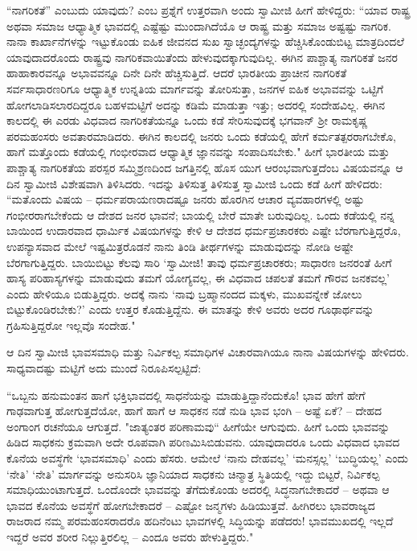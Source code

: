 “ನಾಗರಿಕತೆ” ಎಂಬುದು ಯಾವುದು? ಎಂಬ ಪ್ರಶ್ನೆಗೆ ಉತ್ತರವಾಗಿ ಅಂದು ಸ್ವಾಮೀಜಿ ಹೀಗೆ ಹೇಳಿದ್ದರು: “ಯಾವ ರಾಷ್ಟ್ರ ಅಥವಾ ಸಮಾಜ ಆಧ್ಯಾತ್ಮಿಕ ಭಾವದಲ್ಲಿ ಎಷ್ಟೆಷ್ಟು ಮುಂದಾಗಿದೆಯೊ ಆ ರಾಷ್ಟ್ರ ಮತ್ತು ಸಮಾಜ ಅಷ್ಟಷ್ಟು ನಾಗರಿಕ. ನಾನಾ ಕಾರ್ಖಾನೆಗಳನ್ನು ಇಟ್ಟುಕೊಂಡು ಐಹಿಕ ಜೀವನದ ಸುಖ ಸ್ವಾಚ್ಛಂದ್ಯಗಳನ್ನು ಹೆಚ್ಚಿಸಿಕೊಂಡುಬಿಟ್ಟ ಮಾತ್ರದಿಂದಲೆ ಯಾವುದಾದರೊಂದು ರಾಷ್ಟ್ರವು ನಾಗರಿಕವಾಯಿತೆಂದು ಹೇಳುವುದಕ್ಕಾಗುವುದಿಲ್ಲ. ಈಗಿನ ಪಾಶ್ಚಾತ್ಯ ನಾಗರಿಕತೆ ಜನರ ಹಾಹಾಕಾರವನ್ನೂ ಅಭಾವವನ್ನೂ ದಿನೇ ದಿನೇ ಹೆಚ್ಚಿಸುತ್ತಿದೆ. ಆದರೆ ಭಾರತೀಯ ಪ್ರಾಚೀನ ನಾಗರಿಕತೆ ಸರ್ವಸಾಧಾರಣರಿಗೂ ಆಧ್ಯಾತ್ಮಿಕ ಉನ್ನತಿಯ ಮಾರ್ಗವನ್ನು ತೋರಿಸುತ್ತಾ, ಜನಗಳ ಐಹಿಕ ಅಭಾವವನ್ನು ಒಟ್ಟಿಗೆ ಹೋಗಲಾಡಿಸಲಾರದಿದ್ದರೂ ಬಹಳಮಟ್ಟಿಗೆ ಅದನ್ನು ಕಡಿಮೆ ಮಾಡುತ್ತಾ ಇತ್ತು; ಅದರಲ್ಲಿ ಸಂದೇಹವಿಲ್ಲ. ಈಗಿನ ಕಾಲದಲ್ಲಿ ಈ ಎರಡು ವಿಧವಾದ ನಾಗರಿಕತೆಯನ್ನೂ ಒಂದು ಕಡೆ ಸೇರಿಸುವುದಕ್ಕೆ ಭಗವಾನ್ ಶ‍್ರೀ ರಾಮಕೃಷ್ಣ ಪರಮಹಂಸರು ಅವತಾರಮಾಡಿದರು. ಈಗಿನ ಕಾಲದಲ್ಲಿ ಜನರು ಒಂದು ಕಡೆಯಲ್ಲಿ ಹೇಗೆ ಕರ್ಮತತ್ಪರರಾಗಬೇಕೊ, ಹಾಗೆ ಮತ್ತೊಂದು ಕಡೆಯಲ್ಲಿ ಗಂಭೀರವಾದ ಆಧ್ಯಾತ್ಮಿಕ ಜ್ಞಾನವನ್ನು ಸಂಪಾದಿಸಬೇಕು." ಹೀಗೆ ಭಾರತೀಯ ಮತ್ತು ಪಾಶ್ಚಾತ್ಯ ನಾಗರಿಕತೆಯ ಪರಸ್ಪರ ಸಮ್ಮಿಶ್ರಣದಿಂದ ಜಗತ್ತಿನಲ್ಲಿ ಹೊಸ ಯುಗ ಆರಂಭವಾಗುತ್ತದೆಂಬ ವಿಷಯವನ್ನೂ ಆ ದಿನ ಸ್ವಾಮೀಜಿ ವಿಶೇಷವಾಗಿ ತಿಳಿಸಿದರು. ಇದನ್ನು ತಿಳಿಸುತ್ತ ತಿಳಿಸುತ್ತ ಸ್ವಾಮೀಜಿ ಒಂದು ಕಡೆ ಹೀಗೆ ಹೇಳಿದರು: “ಮತೊಂದು ವಿಷಯ – ಧರ್ಮಪರಾಯಣರಾದಷ್ಟೂ ಜನರು ಹೊರಗಿನ ಆಚಾರ ವ್ಯವಹಾರಗಳಲ್ಲಿ ಅಷ್ಟು ಗಂಭೀರರಾಗಬೇಕೆಂದು ಆ ದೇಶದ ಜನರ ಭಾವನೆ; ಬಾಯಲ್ಲಿ ಬೇರೆ ಮಾತೇ ಬರುವುದಿಲ್ಲ. ಒಂದು ಕಡೆಯಲ್ಲಿ ನನ್ನ ಬಾಯಿಂದ ಉದಾರವಾದ ಧಾರ್ಮಿಕ ವಿಷಯಗಳನ್ನು ಕೇಳಿ ಆ ದೇಶದ ಧರ್ಮಪ್ರಚಾರಕರು ಎಷ್ಟೇ ಬೆರಗಾಗುತ್ತಿದ್ದರೊ, ಉಪನ್ಯಾಸವಾದ ಮೇಲೆ ಇಷ್ಟಮಿತ್ರರೊಡನೆ ನಾನು ತಿಂಡಿ ತೀರ್ಥಗಳನ್ನು ಮಾಡುವುದನ್ನು ನೋಡಿ ಅಷ್ಟೇ ಬೆರಗಾಗುತ್ತಿದ್ದರು. ಬಾಯಿಬಿಟ್ಟು ಕೆಲವು ಸಾರಿ ‘ಸ್ವಾಮೀಜಿ! ತಾವು ಧರ್ಮಪ್ರಚಾರಕರು; ಸಾಧಾರಣ ಜನರಂತೆ ಹೀಗೆ ಹಾಸ್ಯ ಪರಿಹಾಸ್ಯಗಳನ್ನು ಮಾಡುವುದು ತಮಗೆ ಯೋಗ್ಯವಲ್ಲ, ಈ ವಿಧವಾದ ಚಪಲತೆ ತಮಗೆ ಗೌರವ ಜನಕವಲ್ಲ’ ಎಂದು ಹೇಳಿಯೂ ಬಿಡುತ್ತಿದ್ದರು. ಅದಕ್ಕೆ ನಾನು ‘ನಾವು ಬ್ರಹ್ಮಾನಂದದ ಮಕ್ಕಳು, ಮುಖವನ್ನೇಕೆ ಜೋಲು ಬಿಟ್ಟುಕೊಂಡಿರಬೇಕು?’ ಎಂದು ಉತ್ತರ ಕೊಡುತ್ತಿದ್ದೆನು. ಈ ಮಾತನ್ನು ಕೇಳಿ ಅವರು ಅದರ ಗೂಢಾರ್ಥವನ್ನು ಗ್ರಹಿಸುತ್ತಿದ್ದರೋ ಇಲ್ಲವೊ ಸಂದೇಹ."

ಆ ದಿನ ಸ್ವಾಮೀಜಿ ಭಾವಸಮಾಧಿ ಮತ್ತು ನಿರ್ವಿಕಲ್ಪ ಸಮಾಧಿಗಳ ವಿಚಾರವಾಗಿಯೂ ನಾನಾ ವಿಷಯಗಳನ್ನು ಹೇಳಿದರು. ಸಾಧ್ಯವಾದಷ್ಟು ಮಟ್ಟಿಗೆ ಅದು ಮುಂದೆ ನಿರೂಪಿಸಲ್ಪಟ್ಟಿದೆ:

“ಒಬ್ಬನು ಹನುಮಂತನ ಹಾಗೆ ಭಕ್ತಿಭಾವದಲ್ಲಿ ಸಾಧನೆಯನ್ನು ಮಾಡುತ್ತಿದ್ದಾನೆಂದುಕೊ! ಭಾವ ಹೇಗೆ ಹೇಗೆ ಗಾಢವಾಗುತ್ತ ಹೋಗುತ್ತದೆಯೋ, ಹಾಗೆ ಹಾಗೆ ಆ ಸಾಧಕನ ನಡೆ ನುಡಿ ಭಾವ ಭಂಗಿ – ಅಷ್ಟೆ ಏಕೆ? – ದೇಹದ ಅಂಗಾಂಗ ರಚನೆಯೂ ಆಗುತ್ತದೆ. "ಜಾತ್ಯಂತರ ಪರಿಣಾಮವು“ ಹೀಗೆಯೇ ಆಗುವುದು. ಹೀಗೆ ಒಂದು ಭಾವವನ್ನು ಹಿಡಿದ ಸಾಧಕನು ಕ್ರಮವಾಗಿ ಅದೇ ರೂಪವಾಗಿ ಪರಿಣಮಿಸಿಬಿಡುವನು. ಯಾವುದಾದರೂ ಒಂದು ವಿಧವಾದ ಭಾವದ ಕೊನೆಯ ಅವಸ್ಥೆಗೇ ‘ಭಾವಸಮಾಧಿ’ ಎಂದು ಹೆಸರು. ಆಮೇಲೆ ‘ನಾನು ದೇಹವಲ್ಲ’ ‘ಮನಸ್ಸಲ್ಲ’ ‘ಬುದ್ಧಿಯಲ್ಲ’ ಎಂದು ‘ನೇತಿ’ ‘ನೇತಿ’ ಮಾರ್ಗವನ್ನು ಅನುಸರಿಸಿ ಜ್ಞಾನಿಯಾದ ಸಾಧಕನು ಚಿನ್ಮಾತ್ರ ಸ್ಥಿತಿಯಲ್ಲಿ ಇದ್ದು ಬಿಟ್ಟರೆ, ನಿರ್ವಿಕಲ್ಪ ಸಮಾಧಿಯುಂಟಾಗುತ್ತದೆ. ಒಂದೊಂದೇ ಭಾವವನ್ನು ತೆಗೆದುಕೊಂಡು ಅದರಲ್ಲಿ ಸಿದ್ಧನಾಗಬೇಕಾದರೆ – ಅಥವಾ ಆ ಭಾವದ ಕೊನೆಯ ಅವಸ್ಥೆಗೆ ಹೋಗಬೇಕಾದರೆ – ಎಷ್ಟೋ ಜನ್ಮಗಳು ಹಿಡಿಯುತ್ತವೆ. ಹೀಗಿರಲು ಭಾವರಾಜ್ಯದ ರಾಜರಾದ ನಮ್ಮ ಪರಮಹಂಸರಾದರೊ ಹದಿನೆಂಟು ಭಾವಗಳಲ್ಲಿ ಸಿದ್ಧಿಯನ್ನು ಪಡೆದರು! ಭಾವಮುಖದಲ್ಲಿ ಇಲ್ಲದೆ ಇದ್ದರೆ ಅವರ ಶರೀರ ನಿಲ್ಲುತ್ತಿರಲಿಲ್ಲ – ಎಂದೂ ಅವರು ಹೇಳುತ್ತಿದ್ದರು."

